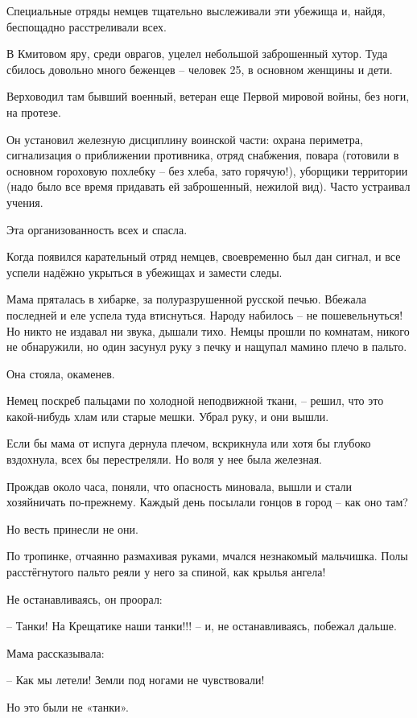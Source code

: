 Специальные отряды немцев тщательно выслеживали эти убежища и, найдя,
беспощадно расстреливали всех.

В Кмитовом яру, среди оврагов, уцелел небольшой заброшенный хутор. Туда сбилось
довольно много беженцев – человек 25, в основном женщины и дети.

Верховодил там бывший военный, ветеран еще Первой мировой войны, без ноги, на
протезе.

Он установил железную дисциплину воинской части: охрана периметра, сигнализация
о приближении противника, отряд снабжения, повара (готовили в основном
гороховую похлебку – без хлеба, зато горячую!), уборщики территории (надо было
все время придавать ей заброшенный, нежилой вид). Часто устраивал учения.

Эта организованность всех и спасла.

Когда появился карательный отряд немцев, своевременно был дан сигнал, и все
успели надёжно укрыться в убежищах и замести следы.

Мама пряталась в хибарке, за полуразрушенной русской печью. Вбежала последней и
еле успела туда втиснуться. Народу набилось – не пошевельнуться! Но никто не
издавал ни звука, дышали тихо. Немцы прошли по комнатам, никого не обнаружили,
но один засунул руку з печку и нащупал мамино плечо в пальто.

Она стояла, окаменев.

Немец поскреб пальцами по холодной неподвижной ткани, – решил, что это
какой-нибудь хлам или старые мешки. Убрал руку, и они вышли.

Если бы мама от испуга дернула плечом, вскрикнула или хотя бы глубоко
вздохнула, всех бы перестреляли. Но воля у нее была железная.

Прождав около часа, поняли, что опасность миновала, вышли и стали хозяйничать
по-прежнему. Каждый день посылали гонцов в город – как оно там?

Но весть принесли не они.

По тропинке, отчаянно размахивая руками, мчался незнакомый мальчишка. Полы
расстёгнутого пальто реяли у него за спиной, как крылья ангела!

Не останавливаясь, он проорал:

– Танки! На Крещатике наши танки!!! – и, не останавливаясь, побежал дальше.

Мама рассказывала:

– Как мы летели! Земли под ногами не чувствовали!

Но это были не «танки».

